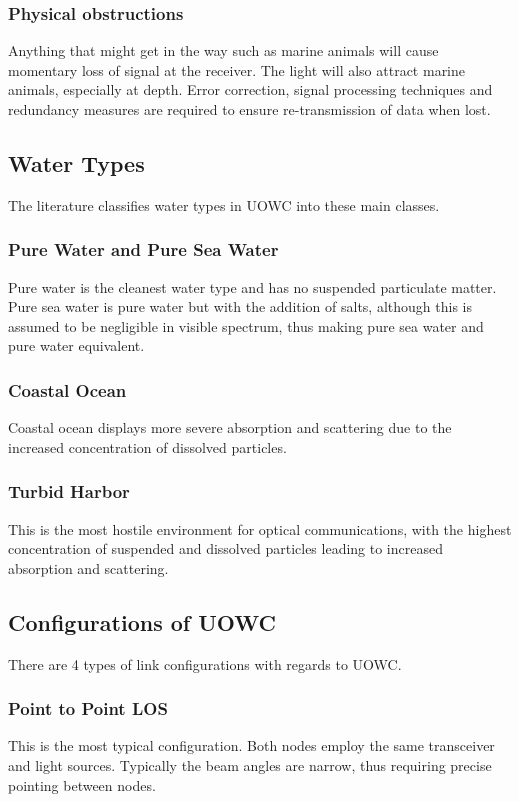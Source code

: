 \subsubsection{Physical obstructions}
Anything that might get in the way such as marine animals will cause
momentary loss of signal at the receiver. The light will also attract
marine animals, especially at depth. Error correction, signal processing
techniques and redundancy measures are required to ensure re-transmission
of data when lost.

\subsection{Water Types}
The literature classifies water types in \ac{UOWC} into these main classes.

\subsubsection{Pure Water and Pure Sea Water}
Pure water is the cleanest water type and has no suspended particulate
matter. Pure sea water is pure water but with the addition of salts,
although this is assumed to be negligible in visible spectrum, thus
making pure sea water and pure water equivalent.

\subsubsection{Coastal Ocean}
Coastal ocean displays more severe absorption and scattering due to the
increased concentration of dissolved particles.

\subsubsection{Turbid Harbor}
This is the most hostile environment for optical communications,
with the highest concentration of suspended and dissolved particles
leading to increased absorption and scattering.


\subsection{Configurations of UOWC}
There are 4 types of link configurations with regards to \ac{UOWC}.

\subsubsection{Point to Point \ac{LOS}}
This is the most typical configuration. Both nodes employ the same
transceiver and light sources. Typically the beam angles are narrow, thus
requiring precise pointing between nodes.

